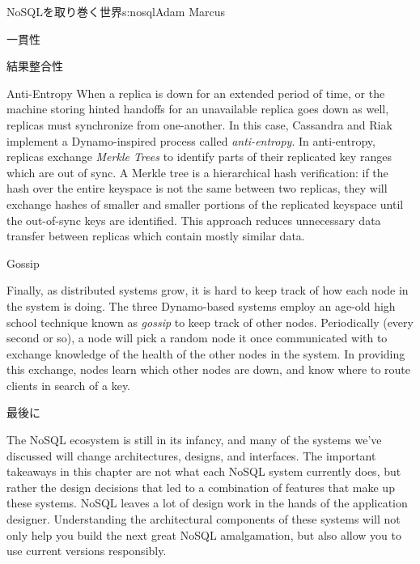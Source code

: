 \begin{aosachapter}{NoSQLを取り巻く世界}{s:nosql}{Adam Marcus}
\begin{aosasect1}{一貫性}
\begin{aosasect2}{結果整合性}
\begin{aosasect3}{Anti-Entropy}
When a replica is down for an extended period of time, or the machine
storing hinted handoffs for an unavailable replica goes down as well,
replicas must synchronize from one-another.  In this case, Cassandra
and Riak implement a Dynamo-inspired process called
\emph{anti-entropy}.  In anti-entropy, replicas exchange \emph{Merkle
Trees} to identify parts of their replicated key ranges which are
out of sync.  A Merkle tree is a hierarchical hash verification: if
the hash over the entire keyspace is not the same between two
replicas, they will exchange hashes of smaller and smaller portions of
the replicated keyspace until the out-of-sync keys are identified.
This approach reduces unnecessary data transfer between replicas which
contain mostly similar data.

\end{aosasect3}

\begin{aosasect3}{Gossip}

Finally, as distributed systems grow, it is hard to keep track of how
each node in the system is doing.  The three Dynamo-based systems
employ an age-old high school technique known as \emph{gossip} to keep
track of other nodes.  Periodically (every second or so), a node will
pick a random node it once communicated with to exchange knowledge of
the health of the other nodes in the system.  In providing this
exchange, nodes learn which other nodes are down, and know where to
route clients in search of a key.

\end{aosasect3}

\end{aosasect2}

\end{aosasect1}

\begin{aosasect1}{最後に}

The NoSQL ecosystem is still in its infancy, and many of the
systems we've discussed will change architectures, designs, and
interfaces.  The important takeaways in this chapter are not what
each NoSQL system currently does, but rather the design decisions that
led to a combination of features that make up these systems.  NoSQL
leaves a lot of design work in the hands of the application designer.
Understanding the architectural components of these systems will not
only help you build the next great NoSQL amalgamation, but also allow
you to use current versions responsibly.


\end{aosasect1}
\end{aosachapter}
